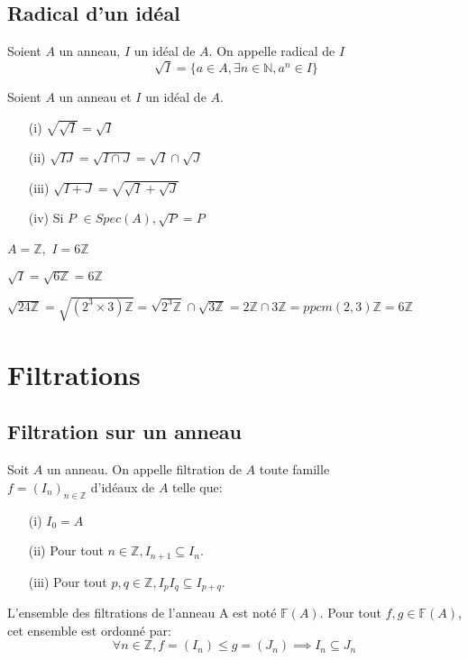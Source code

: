 \subsection{Radical d'un idéal}
\begin{madefinition}
	Soient $A$ un anneau, $I$ un idéal de $A$. On appelle radical de $I$
	\[\sqrt[]{I} = \{ a \in A, \exists n \in \mathbb{N}, a^n \in I \} \]
\end{madefinition}
\begin{maproposition}
	Soient $A$ un anneau et $I$ un idéal de $A$.
	\begin{enumerate}
		\item[(i)] $\sqrt{\sqrt{I}} = \sqrt{I}$
		
		\item[(ii)] $\sqrt{IJ} = \sqrt{I\cap J}=\sqrt{I}\cap \sqrt{J}$
		
		\item[(iii)] $\sqrt{I+J} = \sqrt{\sqrt{I}+\sqrt{J}}$
		
		\item[(iv)] Si $P$ $\in Spec(A),\sqrt{P}=P$
	\end{enumerate}
\end{maproposition}
\begin{monexemple}
	$A=\mathbb{Z},$ $I=6\mathbb{Z}$
	
	$\sqrt{I}=\sqrt{6\mathbb{Z}}=6\mathbb{Z}$
	
	$\sqrt{24\mathbb{Z}}=\sqrt{(2^{3}\times 3)\mathbb{Z}}=\sqrt{2^{3}\mathbb{Z}}\cap \sqrt{3\mathbb{Z}}=2\mathbb{Z}\cap 3\mathbb{Z}=ppcm(2,3)\mathbb{Z}=6\mathbb{Z}$
\end{monexemple}
\section{Filtrations}
\subsection{Filtration sur un anneau}
\begin{madefinition}
	Soit $A$ un anneau. On appelle filtration de $A$ toute famille\\ $f = (I_n)_{n \in \mathbb{Z}}$ d'idéaux de $A$ telle que:\\
	\begin{enumerate}
		\item[(i)] $I_0 = A$ \\
		\item[(ii)] Pour tout $n \in \mathbb{Z}, I_{n+1} \subseteq I_n$.\\
		\item[(iii)] Pour tout $p,q \in \mathbb{Z}, I_pI_q \subseteq I_{p+q}$.\\
	\end{enumerate}
	L'ensemble des filtrations de l'anneau A est noté $\mathbb{F}(A)$. Pour tout $f,g \in \mathbb{F}(A)$, cet ensemble est ordonné par:
	\[\forall n \in \mathbb{Z}, f = (I_n) \leqslant g = (J_n) \implies  I_n \subseteq J_n \]
\end{madefinition}

